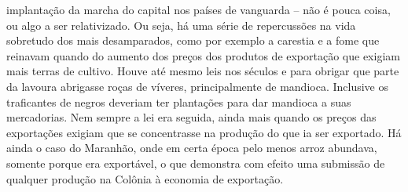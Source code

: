 implantação da marcha do capital nos países de vanguarda -- não é pouca
coisa, ou algo a ser relativizado. Ou seja, há uma série de repercussões
na vida sobretudo dos mais desamparados, como por exemplo a carestia e a
fome que reinavam quando do aumento dos preços dos produtos de
exportação que exigiam mais terras de cultivo. Houve até mesmo leis nos
séculos  e  para obrigar que parte da lavoura abrigasse roças
de víveres, principalmente de mandioca. Inclusive os traficantes de
negros deveriam ter plantações para dar mandioca a suas mercadorias. Nem
sempre a lei era seguida, ainda mais quando os preços das exportações
exigiam que se concentrasse na produção do que ia ser exportado. Há
ainda o caso do Maranhão, onde em certa época pelo menos arroz abundava,
somente porque era exportável, o que demonstra com efeito uma submissão
de qualquer produção na Colônia à economia de exportação.

